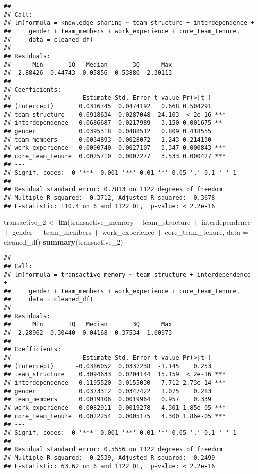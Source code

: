 \documentclass[]{article}
\newenvironment{Shaded}{\begin{snugshade}}{\end{snugshade}}
\newcommand{\DataTypeTok}[1]{\textcolor[rgb]{0.13,0.29,0.53}{#1}}
\newcommand{\DecValTok}[1]{\textcolor[rgb]{0.00,0.00,0.81}{#1}}
\newcommand{\KeywordTok}[1]{\textcolor[rgb]{0.13,0.29,0.53}{\textbf{#1}}}
\newcommand{\NormalTok}[1]{#1}
\newcommand{\OperatorTok}[1]{\textcolor[rgb]{0.81,0.36,0.00}{\textbf{#1}}}
\newcommand{\StringTok}[1]{\textcolor[rgb]{0.31,0.60,0.02}{#1}}
\begin{document}
\begin{verbatim}
## 
## Call:
## lm(formula = knowledge_sharing ~ team_structure + interdependence + 
##     gender + team_members + work_experience + core_team_tenure, 
##     data = cleaned_df)
## 
## Residuals:
##      Min       1Q   Median       3Q      Max 
## -2.88426 -0.44743  0.05856  0.53880  2.30113 
## 
## Coefficients:
##                    Estimate Std. Error t value Pr(>|t|)    
## (Intercept)       0.0316745  0.0474192   0.668 0.504291    
## team_structure    0.6918634  0.0287048  24.103  < 2e-16 ***
## interdependence   0.0686687  0.0217989   3.150 0.001675 ** 
## gender            0.0395318  0.0488512   0.809 0.418555    
## team_members     -0.0034893  0.0028072  -1.243 0.214130    
## work_experience   0.0090740  0.0027107   3.347 0.000843 ***
## core_team_tenure  0.0025710  0.0007277   3.533 0.000427 ***
## ---
## Signif. codes:  0 '***' 0.001 '**' 0.01 '*' 0.05 '.' 0.1 ' ' 1
## 
## Residual standard error: 0.7813 on 1122 degrees of freedom
## Multiple R-squared:  0.3712, Adjusted R-squared:  0.3678 
## F-statistic: 110.4 on 6 and 1122 DF,  p-value: < 2.2e-16
\end{verbatim}

\begin{Shaded}
\begin{Highlighting}[]
\NormalTok{transactive_}\DecValTok{2}\NormalTok{ <-}\StringTok{ }\KeywordTok{lm}\NormalTok{(transactive_memory }\OperatorTok{~}\StringTok{ }\NormalTok{team_structure }\OperatorTok{+}\StringTok{ }\NormalTok{interdependence }\OperatorTok{+}\StringTok{ }\NormalTok{gender }\OperatorTok{+}\StringTok{ }\NormalTok{team_members }\OperatorTok{+}\StringTok{ }\NormalTok{work_experience }\OperatorTok{+}\StringTok{ }\NormalTok{core_team_tenure, }\DataTypeTok{data =}\NormalTok{ cleaned_df)}
\KeywordTok{summary}\NormalTok{(transactive_}\DecValTok{2}\NormalTok{)}
\end{Highlighting}
\end{Shaded}

\begin{verbatim}
## 
## Call:
## lm(formula = transactive_memory ~ team_structure + interdependence + 
##     gender + team_members + work_experience + core_team_tenure, 
##     data = cleaned_df)
## 
## Residuals:
##      Min       1Q   Median       3Q      Max 
## -2.28962 -0.30440  0.04168  0.37534  1.60973 
## 
## Coefficients:
##                    Estimate Std. Error t value Pr(>|t|)    
## (Intercept)      -0.0386052  0.0337238  -1.145    0.253    
## team_structure    0.3094633  0.0204144  15.159  < 2e-16 ***
## interdependence   0.1195520  0.0155030   7.712 2.73e-14 ***
## gender            0.0373312  0.0347422   1.075    0.283    
## team_members      0.0019106  0.0019964   0.957    0.339    
## work_experience   0.0082911  0.0019278   4.301 1.85e-05 ***
## core_team_tenure  0.0022254  0.0005175   4.300 1.86e-05 ***
## ---
## Signif. codes:  0 '***' 0.001 '**' 0.01 '*' 0.05 '.' 0.1 ' ' 1
## 
## Residual standard error: 0.5556 on 1122 degrees of freedom
## Multiple R-squared:  0.2539, Adjusted R-squared:  0.2499 
## F-statistic: 63.62 on 6 and 1122 DF,  p-value: < 2.2e-16
\end{verbatim}
\end{document}
